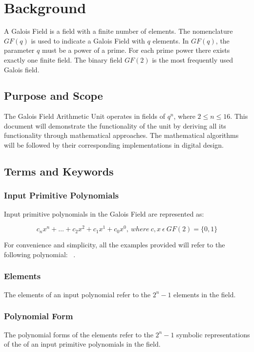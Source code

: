 \section{Background} A Galois Field is a field with a finite number of
elements. The nomenclature $GF(q)$ is used to indicate a Galois Field with $q$
elements. In $GF(q)$, the parameter $q$ must be a power of a prime. For each
prime power there exists exactly one finite field. The binary field $GF(2)$ is
the most frequently used Galois field. \cite{wolfdef}

    \subsection{Purpose and Scope} The Galois Field Arithmetic Unit
    operates in fields of $q^n$, where $2 \leq n \leq 16$. This document
    will demonstrate the functionality of the unit by deriving all its
    functionality through mathematical approaches. The mathematical
    algorithms will be followed by their corresponding implementations in
    digital design.

    \subsection{Terms and Keywords}

        \subsubsection{Input Primitive Polynomials} Input primitive
        polynomials in the Galois Field are represented as:

        \[ c_{n}x^{n}+\ldots+c_{2}x^{2}+c_{1}x^{1}+c_{0}x^{0}, \ where \
        c,x \ \epsilon \ GF(2)=\{0,1\} \]

        For convenience and simplicity, all the examples provided will
        refer to the following polynomial: \examplepoly~.

        \subsubsection{Elements} The elements of an input polynomial refer
        to the $2^{n}-1$ elements in the field.

        \subsubsection{Polynomial Form} The polynomial forms of the
        elements refer to the $2^{n}-1$ symbolic representations of the of
        an input primitive polynomials in the field.

